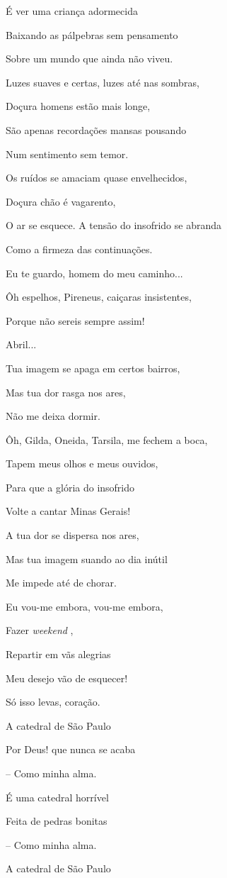 É ver uma criança adormecida

Baixando as pálpebras sem pensamento

Sobre um mundo que ainda não viveu.

Luzes suaves e certas, luzes até nas sombras,

Doçura homens estão mais longe,

São apenas recordações mansas pousando

Num sentimento sem temor.

Os ruídos se amaciam quase envelhecidos,

Doçura chão é vagarento,

O ar se esquece. A tensão do insofrido se abranda

Como a firmeza das continuações.

Eu te guardo, homem do meu caminho...

Ôh espelhos, Pireneus, caiçaras insistentes,

Porque não sereis sempre assim!

Abril...

Tua imagem se apaga em certos bairros,

Mas tua dor rasga nos ares,

Não me deixa dormir.

Ôh, Gilda, Oneida, Tarsila, me fechem a boca,

Tapem meus olhos e meus ouvidos,

Para que a glória do insofrido

Volte a cantar Minas Gerais!

A tua dor se dispersa nos ares,

Mas tua imagem suando ao dia inútil

Me impede até de chorar.

Eu vou-me embora, vou-me embora,

Fazer \emph{weekend} ,

Repartir em vãs alegrias

Meu desejo vão de esquecer!

Só isso levas, coração.

A catedral de São Paulo

Por Deus! que nunca se acaba

-- Como minha alma.

É uma catedral horrível

Feita de pedras bonitas

-- Como minha alma.

A catedral de São Paulo

